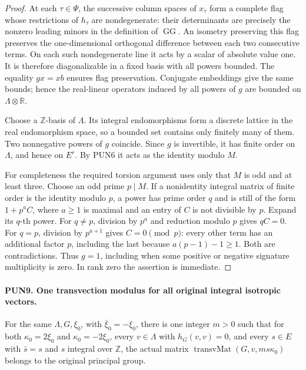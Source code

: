 \documentclass[11pt,a4paper]{article}
\numberwithin{equation}{section}
\theoremstyle{remark}\newtheorem{remark}[theorem]{Remark}
\begin{document}
\begin{proof}
At each \(\tau\in\Psi\), the successive column spaces of
\(x_\tau\) form a complete flag whose restrictions of
\(h_\tau\) are nondegenerate: their determinants are precisely
the nonzero leading minors in the definition of \(\operatorname{GG}\).
An isometry preserving this flag preserves the one-dimensional
orthogonal difference between each two consecutive terms.  On
each such nondegenerate line it acts by a scalar of absolute value
one.  It is therefore diagonalizable in a fixed basis with all
powers bounded.  The equality \(g x=x b\) ensures flag
preservation.  Conjugate embeddings give the same bounds; hence
the real-linear operators induced by all powers of \(g\) are
bounded on \(\Lambda\otimes\mathbb R\).

Choose a \(\mathbb Z\)-basis of \(\Lambda\).  Its integral
endomorphisms form a discrete lattice in the real endomorphism
space, so a bounded set contains only finitely many of them.
Two nonnegative powers of \(g\) coincide.  Since \(g\) is
invertible, it has finite order on \(\Lambda\), and hence on
\(E^r\).  By PUN6 it acts as the identity modulo \(M\).

For completeness the required torsion argument uses only that
\(M\) is odd and at least three.  Choose an odd prime \(p\mid M\).
If a nonidentity integral matrix of finite order is the identity
modulo \(p\), a power has prime order \(q\) and is still of
the form \(1+p^a C\), where \(a\ge1\) is maximal and an entry
of \(C\) is not divisible by \(p\).  Expand its \(q\)-th power.
For \(q\ne p\), division by \(p^a\) and reduction modulo \(p\)
gives \(qC=0\).  For \(q=p\), division by \(p^{a+1}\) gives
\(C=0\pmod p\): every other term has an additional factor
\(p\), including the last because \(a(p-1)-1\ge1\).
Both are contradictions.  Thus \(g=1\), including when some
positive or negative signature multiplicity is zero.  In rank
zero the assertion is immediate.
\end{proof}

\paragraph{PUN9. One transvection modulus for all original integral isotropic vectors.}
\label{claim:PUN9}
For the same \(\Lambda,G,\xi_0\), with
\(\bar\xi_0=-\xi_0\), there is one integer \(m>0\) such that
for both \(\kappa_0=2\xi_0\) and \(\kappa_0=-2\xi_0\),
every \(v\in\Lambda\) with \(h_G(v,v)=0\), and every
\(s\in E\) with \(\bar s=s\) and \(s\) integral over
\(\mathbb Z\), the actual matrix
\(\operatorname{transvMat}(G,v,ms\kappa_0)\) belongs to the
original principal group.
\end{document}
